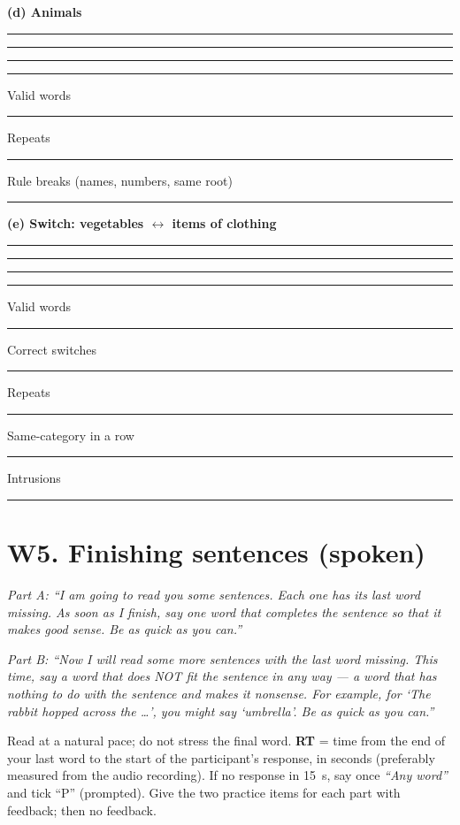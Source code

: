 \documentclass[10pt,a4paper]{article}
\newcommand{\blank}[1][1.2cm]{\rule{#1}{0.4pt}}
\begin{document}
\par{}\medskip\textbf{(d) Animals}\par\vspace{2pt}\blank[\linewidth]\par\vspace{9pt}\blank[\linewidth]\par\vspace{9pt}\blank[\linewidth]\par\vspace{9pt}\blank[\linewidth]\par\vspace{9pt}
Valid words \blank\quad Repeats \blank\quad Rule breaks (names, numbers, same root) \blank\par
\par{}\medskip\textbf{(e) Switch: vegetables $\leftrightarrow$ items of clothing}\par\vspace{2pt}\blank[\linewidth]\par\vspace{9pt}\blank[\linewidth]\par\vspace{9pt}\blank[\linewidth]\par\vspace{9pt}\blank[\linewidth]\par\vspace{9pt}
Valid words \blank\quad Correct switches \blank\quad Repeats \blank\quad Same-category in a row \blank\quad Intrusions \blank\par
\section*{W5. Finishing sentences (spoken)}
\textit{Part A: ``I am going to read you some sentences. Each one has its last word missing. As soon as I finish, say one word that completes the sentence so that it makes good sense. Be as quick as you can.''}

\textit{Part B: ``Now I will read some more sentences with the last word missing. This time, say a word that does NOT fit the sentence in any way --- a word that has nothing to do with the sentence and makes it nonsense. For example, for `The rabbit hopped across the \ldots', you might say `umbrella'. Be as quick as you can.''}

Read at a natural pace; do not stress the final word. \textbf{RT} = time from the end of your last word to the start of the participant's response, in seconds (preferably measured from the audio recording). If no response in 15~s, say once \textit{``Any word''} and tick ``P'' (prompted). Give the two practice items for each part with feedback; then no feedback.
\end{document}
